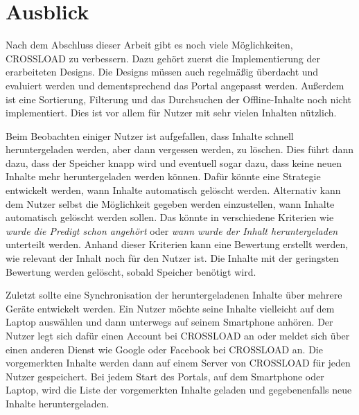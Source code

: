 \section{Ausblick}
Nach dem Abschluss dieser Arbeit gibt es noch viele Möglichkeiten, CROSSLOAD zu verbessern. Dazu gehört zuerst die Implementierung der erarbeiteten Designs. Die Designs müssen auch regelmäßig überdacht und evaluiert werden und dementsprechend das Portal angepasst werden. Außerdem ist eine Sortierung, Filterung und das Durchsuchen der Offline-Inhalte noch nicht implementiert. Dies ist vor allem für Nutzer mit sehr vielen Inhalten nützlich. 

Beim Beobachten einiger Nutzer ist aufgefallen, dass Inhalte schnell heruntergeladen werden, aber dann vergessen werden, zu löschen. Dies führt dann dazu, dass der Speicher knapp wird und eventuell sogar dazu, dass keine neuen Inhalte mehr heruntergeladen werden können. Dafür könnte eine Strategie entwickelt werden, wann Inhalte automatisch gelöscht werden. Alternativ kann dem Nutzer selbst die Möglichkeit gegeben werden einzustellen, wann Inhalte automatisch gelöscht werden sollen. Das könnte in verschiedene Kriterien wie \textit{wurde die Predigt schon angehört} oder \textit{wann wurde der Inhalt heruntergeladen} unterteilt werden. Anhand dieser Kriterien kann eine Bewertung erstellt werden, wie relevant der Inhalt noch für den Nutzer ist. Die Inhalte mit der geringsten Bewertung werden gelöscht, sobald Speicher benötigt wird.

Zuletzt sollte eine Synchronisation der heruntergeladenen Inhalte über mehrere Geräte entwickelt werden. Ein Nutzer möchte seine Inhalte vielleicht auf dem Laptop auswählen und dann unterwegs auf seinem Smartphone anhören. Der Nutzer legt sich dafür einen Account bei CROSSLOAD an oder meldet sich über einen anderen Dienst wie Google oder Facebook bei CROSSLOAD an. Die vorgemerkten Inhalte werden dann auf einem Server von CROSSLOAD für jeden Nutzer gespeichert. Bei jedem Start des Portals, auf dem Smartphone oder Laptop, wird die Liste der vorgemerkten Inhalte geladen und gegebenenfalls neue Inhalte heruntergeladen. 
